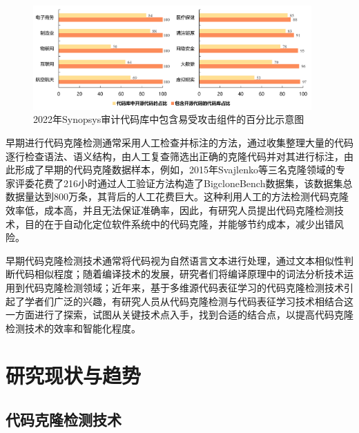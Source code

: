 \begin{figure}[H]
    \centering
    \includegraphics[width=0.95\textwidth]{figures/assembly}
    \caption{2022年Synopsys审计代码库中包含易受攻击组件的百分比示意图}
    \label{fig:assembly}
\end{figure}

早期进行代码克隆检测通常采用人工检查并标注的方法，通过收集整理大量的代码逐行检查语法、语义结构，由人工复查筛选出正确的克隆代码并对其进行标注，由此形成了早期的代码克隆数据样本，例如，2015年Svajlenko\cite{7332459}等三名克隆领域的专家评委花费了216小时通过人工验证方法构造了BigcloneBench数据集，该数据集总数据量达到800万条，其背后的人工花费巨大。这种利用人工的方法检测代码克隆效率低，成本高，并且无法保证准确率\cite{7965429}，因此，有研究人员提出代码克隆检测技术，目的在于自动化定位软件系统中的代码克隆，并能够节约成本，减少出错风险\cite{Yang2015ClassificationMF}。

早期代码克隆检测技术通常将代码视为自然语言文本进行处理，通过文本相似性判断代码相似程度；随着编译技术的发展，研究者们将编译原理中的词法分析技术运用到代码克隆检测领域\cite{zhang2023survey}；近年来，基于多维源代码表征学习的代码克隆检测技术引起了学者们广泛的兴趣，有研究人员从代码克隆检测与代码表征学习技术相结合这一方面进行了探索，试图从关键技术点入手，找到合适的结合点，以提高代码克隆检测技术的效率和智能化程度。


\section{研究现状与趋势}
\label{sec:status}

\subsection{代码克隆检测技术}
\label{subsec:Code clone detection}

